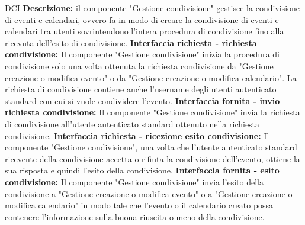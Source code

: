 \begin{listaPersonale}{DCI}
    \textbf{Descrizione:} il componente "Gestione condivisione" gestisce la condivisione di eventi e calendari, ovvero fa in modo di creare la condivisione di eventi e calendari tra utenti sovrintendono l'intera procedura di condivisione fino alla ricevuta dell'esito di condivisione.
    \textbf{Interfaccia richiesta - richiesta condivisione:} Il componente "Gestione condivisione" inizia la procedura di condivisione solo una volta ottenuta la richiesta condivisione da "Gestione creazione o modifica evento" o da "Gestione creazione o modifica calendario". La richiesta di condivisione contiene anche l'username degli utenti autenticato standard con cui si vuole condividere l'evento.
    \textbf{Interfaccia fornita - invio richiesta condivisione:} Il componente "Gestione condivisione" invia la richiesta di condivisione all'utente autenticato standard ottenuto nella richiesta condivisione.
    \textbf{Interfaccia richiesta - ricezione esito condivisione:} Il componente "Gestione condivisione", una volta che l'utente autenticato standard ricevente della condivisione accetta o rifiuta la condivisione dell'evento, ottiene la sua risposta e quindi l'esito della condivisione.
    \textbf{Interfaccia fornita - esito condivisione:} Il componente "Gestione condivisione" invia l'esito della condivisione a "Gestione creazione o modifica evento" o a "Gestione creazione o modifica calendario" in modo tale che l'evento o il calendario creato possa contenere l'informazione sulla buona riuscita o meno della condivisione.



\end{listaPersonale}
